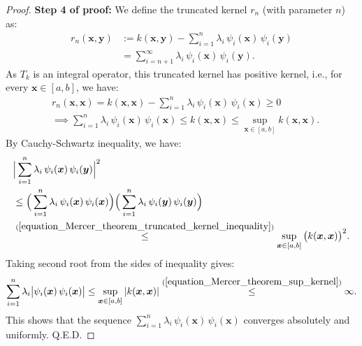 \documentclass[lang=cn,10pt]{gorgeousnbook}
\numberwithin{equation}{section}%
\numberwithin{figure}{section}%
\begin{document}
\begin{proof}
\textbf{Step 4 of proof:} 
We define the truncated kernel $r_n$ (with parameter $n$) as:
\begin{align}
r_n(\boldsymbol{x}, \boldsymbol{y}) &:= k(\boldsymbol{x}, \boldsymbol{y}) - \sum_{i=1}^n \lambda_i\, \psi_i(\boldsymbol{x})\, \psi_i(\boldsymbol{y}) \nonumber \\
&= \sum_{i={n+1}}^\infty \lambda_i\, \psi_i(\boldsymbol{x})\, \psi_i(\boldsymbol{y}).
\end{align}
As $T_k$ is an integral operator, this truncated kernel has positive kernel, i.e., for every $\boldsymbol{x} \in [a,b]$, we have:
\begin{align}
&r_n(\boldsymbol{x}, \boldsymbol{x}) = k(\boldsymbol{x}, \boldsymbol{x}) - \sum_{i=1}^n \lambda_i\, \psi_i(\boldsymbol{x})\, \psi_i(\boldsymbol{x}) \geq 0 \nonumber \\
&\implies \sum_{i=1}^n \lambda_i\, \psi_i(\boldsymbol{x})\, \psi_i(\boldsymbol{x}) \leq k(\boldsymbol{x}, \boldsymbol{x}) \leq \sup_{\boldsymbol{x} \in [a,b]} k(\boldsymbol{x}, \boldsymbol{x}). \label{equation_Mercer_theorem_truncated_kernel_inequality}
\end{align}
By Cauchy-Schwartz inequality, we have:
\begin{align*}
&\Big|\sum_{i=1}^n \lambda_i\, \psi_i(\boldsymbol{x})\, \psi_i(\boldsymbol{y})\Big|^2 \\
&\leq \Big( \sum_{i=1}^n \lambda_i\, \psi_i(\boldsymbol{x})\, \psi_i(\boldsymbol{x}) \Big) \Big( \sum_{i=1}^n \lambda_i\, \psi_i(\boldsymbol{y})\, \psi_i(\boldsymbol{y}) \Big) \\
&\overset{(\ref{equation_Mercer_theorem_truncated_kernel_inequality})}{\leq} \sup_{\boldsymbol{x} \in [a,b]} \big(k(\boldsymbol{x}, \boldsymbol{x})\big)^2.
\end{align*}
Taking second root from the sides of inequality gives:
\begin{align}
\sum_{i=1}^n \lambda_i \big|\psi_i(\boldsymbol{x})\, \psi_i(\boldsymbol{x})\big| \leq \sup_{\boldsymbol{x} \in [a,b]} | k(\boldsymbol{x}, \boldsymbol{x}) | \overset{(\ref{equation_Mercer_theorem_sup_kernel})}{\leq} \infty.
\end{align}
This shows that the sequence $\sum_{i=1}^n \lambda_i\, \psi_i(\boldsymbol{x})\, \psi_i(\boldsymbol{x})$ converges absolutely and uniformly.
Q.E.D.


\end{proof}
\end{document}

